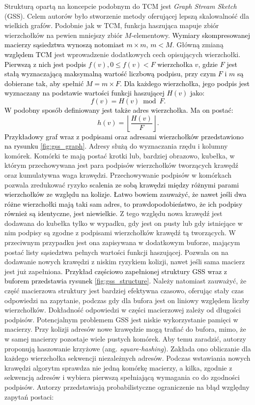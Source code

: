     Strukturą opartą na koncepcie podobnym do TCM jest \textit{Graph Stream Sketch} (GSS)\cite{Gou_Zou_Zhao_Yang_2019}. Celem autorów było stworzenie metody oferującej lepszą skalowalność dla wielkich grafów. Podobnie jak w TCM, funkcja haszująca mapuje zbiór wierzchołków na pewien mniejszy zbiór $M$-elementowy. \textcolor{black}{Wymiary skompresowanej macierzy sąsiedztwa wynoszą notomiast $m \times m$, $m < M$}. Główną zmianą \textcolor{black}{względem TCM} jest wprowadzenie dodatkowych cech opisujących wierzchołki. \textcolor{black}{Pierwszą z nich jest podpis $f(v), 0 \leq f(v) < F$ wierzchołka $v$, gdzie $F$ jest stałą wyznaczającą maksymalną wartość liczbową podpisu, przy czym $F$ i $m$ są dobierane tak, aby spełnić $M = m \times F$. Dla każdego wierzchołka, jego podpis jest wyznaczany na podstawie wartości funkcji haszującej $H(v)$ jako:
    \[
        f(v) = H(v) \bmod F. 
    \] 
    W podobny sposób definiowany jest także adres wierzchołka. Ma on postać:
    \[
        h(v) = \left\lfloor \frac{H(v)}{F} \right\rfloor.
    \]} 
    \textcolor{black}{Przykładowy graf wraz z podpisami oraz adresami wierzchołków przedstawiono na rysunku \ref{fig:gss_graph}}. Adresy służą do wyznaczania rzędu i kolumny komórek. Komórki te mają postać krotki lub, bardziej obrazowo, kubełka, w którym przechowywana jest para podpisów wierzchołków tworzących krawędź oraz kumulatywna waga krawędzi. Przechowywanie podpisów w komórkach pozwala zredukować ryzyko \textcolor{black}{scalenia ze sobą krawędzi między różnymi parami wierzchołków ze względu na kolizje. Łatwo bowiem zauważyć, że nawet jeśli dwa różne wierzchołki mają taki sam adres, to prawdopodobieństwo, że ich podpisy również są identyczne, jest niewielkie.} Z tego względu nowa krawędź jest dodawana do kubełka tylko w wypadku, gdy jest on pusty lub gdy istniejące w nim podpisy są zgodne z podpisami wierzchołków krawędź tą tworzących. W przeciwnym przypadku jest ona zapisywana w dodatkowym buforze, mającym postać listy sąsiedztwa pełnych wartości funkcji haszującej. Pozwala on na dodawanie nowych krawędzi z niskim ryzykiem kolizji, nawet jeśli sama macierz jest już zapełniona. \textcolor{black}{Przykład częściowo zapełnionej struktury GSS wraz z buforem przedstawia rysunek \ref{fig:gss_structure}.} Należy natomiast zauważyć, że część macierzowa struktury jest bardziej efektywna czasowo, oferując stały czas odpowiedzi na zapytanie, podczas gdy dla bufora jest on liniowy względem liczby wierzchołków. Dokładność odpowiedzi w części macierzowej zależy od długości podpisów. Potencjalnym problemem GSS jest niskie wykorzystanie pamięci w macierzy. Przy kolizji adresów nowe krawędzie mogą trafiać do bufora, mimo, że w samej macierzy pozostaje wiele pustych komórek. Aby temu zaradzić, autorzy proponują haszowanie krzyżowe (ang. \textit{square-hashing}). Zakłada ono obliczanie dla każdego wierzchołka sekwencji niezależnych adresów. Podczas wstawiania nowych krawędzi algorytm sprawdza nie jedną komórkę macierzy, a kilka, zgodnie z sekwencją adresów i wybiera pierwszą spełniającą wymagania co do zgodności podpisów. Autorzy przedstawiają probabilistyczne ograniczenie na błąd względny zapytań postaci: 
